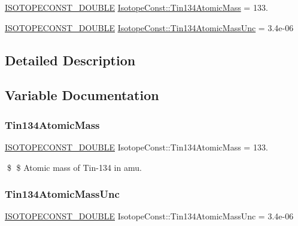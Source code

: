 \begin{DoxyCompactItemize}
\item 
\mbox{\hyperlink{group___isotope_const-_macros_ga8f45a7272ce02c0b4c65c44636ed719a}{I\+S\+O\+T\+O\+P\+E\+C\+O\+N\+S\+T\+\_\+\+D\+O\+U\+B\+LE}} \mbox{\hyperlink{group___isotope_const-_tin-_sn134_ga0bd3f949b224ee703887721ed145259f}{Isotope\+Const\+::\+Tin134\+Atomic\+Mass}} = 133.
\item 
\mbox{\hyperlink{group___isotope_const-_macros_ga8f45a7272ce02c0b4c65c44636ed719a}{I\+S\+O\+T\+O\+P\+E\+C\+O\+N\+S\+T\+\_\+\+D\+O\+U\+B\+LE}} \mbox{\hyperlink{group___isotope_const-_tin-_sn134_ga5589d6233f0a0a81c1919052e5e2e97a}{Isotope\+Const\+::\+Tin134\+Atomic\+Mass\+Unc}} = 3.\+4e-\/06
\end{DoxyCompactItemize}


\subsection{Detailed Description}


\subsection{Variable Documentation}
\mbox{\label{group___isotope_const-_tin-_sn134_ga0bd3f949b224ee703887721ed145259f}} 
\subsubsection{\texorpdfstring{Tin134\+Atomic\+Mass}{Tin134AtomicMass}}
{\footnotesize\ttfamily \mbox{\hyperlink{group___isotope_const-_macros_ga8f45a7272ce02c0b4c65c44636ed719a}{I\+S\+O\+T\+O\+P\+E\+C\+O\+N\+S\+T\+\_\+\+D\+O\+U\+B\+LE}} Isotope\+Const\+::\+Tin134\+Atomic\+Mass = 133.}

\$ \$ Atomic mass of Tin-\/134 in amu. \mbox{\label{group___isotope_const-_tin-_sn134_ga5589d6233f0a0a81c1919052e5e2e97a}} 
\subsubsection{\texorpdfstring{Tin134\+Atomic\+Mass\+Unc}{Tin134AtomicMassUnc}}
{\footnotesize\ttfamily \mbox{\hyperlink{group___isotope_const-_macros_ga8f45a7272ce02c0b4c65c44636ed719a}{I\+S\+O\+T\+O\+P\+E\+C\+O\+N\+S\+T\+\_\+\+D\+O\+U\+B\+LE}} Isotope\+Const\+::\+Tin134\+Atomic\+Mass\+Unc = 3.\+4e-\/06}

